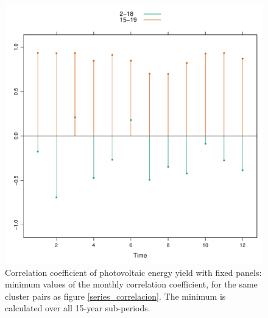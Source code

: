 \begin{figure}[h!]
\includegraphics[scale=0.6]{figs/capitulo5/figure9.pdf}
\caption{Correlation coefficient of photovoltaic energy yield with fixed panels: minimum values of the monthly correlation coefficient, for the same cluster pairs as figure \ref{series_correlacion}. The minimum is calculated over all 15-year sub-periods.}
\label{series_correlacion_meses}
\end{figure}



